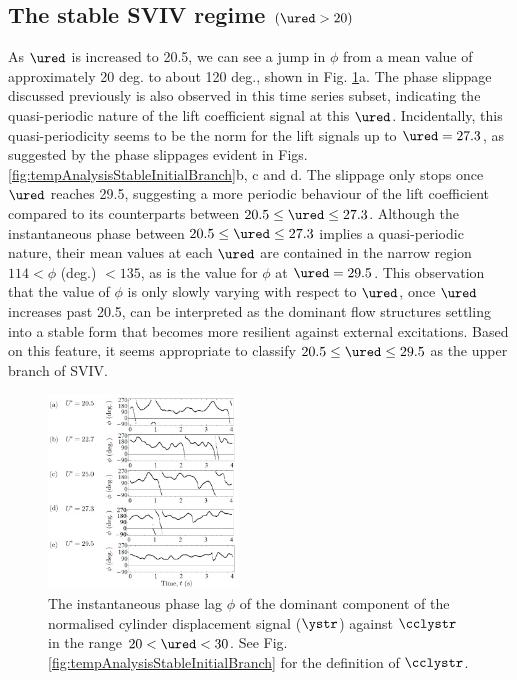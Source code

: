 \documentclass[a4paper,fleqn]{cas-sc}
\begin{document}
\subsection{The stable SVIV regime $\left ( \ured > 20 \right )$} \label{ssec:svivRegime}
As $\ured$ is increased to 20.5, we can see a jump in $\phi$ from a mean value of approximately 20 deg. to about 120 deg., shown in Fig. \ref{fig:phaseAngle}a. The phase slippage discussed previously is also observed in this time series subset, indicating the quasi-periodic nature of the lift coefficient signal at this $\ured$. Incidentally, this quasi-periodicity seems to be the norm for the lift signals up to $\ured = 27.3$, as suggested by the phase slippages evident in Figs. \ref{fig:tempAnalysisStableInitialBranch}b, c and d. The slippage only stops once $\ured$ reaches 29.5, suggesting a more periodic behaviour of the lift coefficient compared to its counterparts between $20.5 \leq \ured \leq 27.3$. Although the instantaneous phase between $20.5 \leq \ured \leq 27.3$ implies a quasi-periodic nature, their mean values at each $\ured$ are contained in the narrow region $114 < \phi$ (deg.) $< 135$, as is the value for $\phi$ at $\ured = 29.5$. This observation that the value of $\phi$ is only slowly varying with respect to $\ured$, once $\ured$ increases past 20.5, can be interpreted as the dominant flow structures settling into a stable form that becomes more resilient against external excitations. Based on this feature, it seems appropriate to classify $20.5 \leq \ured \leq 29.5$ as the upper branch of SVIV.

\begin{figure}
  \centering
  \includegraphics[width=0.45\textwidth]{figs/figure18}
  \caption{The instantaneous phase lag $\phi$ of the dominant component of the normalised cylinder displacement signal ($\ystr$) against $\cclystr$ in the range $20 < \ured < 30$. See Fig. \ref{fig:tempAnalysisStableInitialBranch} for the definition of $\cclystr$.}
  \label{fig:phaseAngle}
\end{figure}
\end{document}
